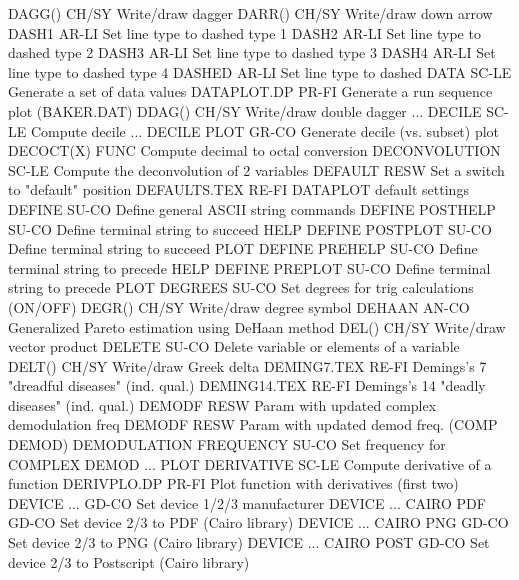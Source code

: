 DAGG()                      CH/SY Write/draw dagger
DARR()                      CH/SY Write/draw down arrow
DASH1                       AR-LI Set line type to dashed type 1
DASH2                       AR-LI Set line type to dashed type 2
DASH3                       AR-LI Set line type to dashed type 3
DASH4                       AR-LI Set line type to dashed type 4
DASHED                      AR-LI Set line type to dashed
DATA                        SC-LE Generate a set of data values
DATAPLOT.DP                 PR-FI Generate a run sequence plot (BAKER.DAT)
DDAG()                      CH/SY Write/draw double dagger
... DECILE                  SC-LE Compute decile
... DECILE PLOT             GR-CO Generate decile (vs. subset) plot
DECOCT(X)                   FUNC  Compute decimal to octal conversion
DECONVOLUTION               SC-LE Compute the deconvolution of 2 variables
DEFAULT                     RESW  Set a switch to "default" position
DEFAULTS.TEX                RE-FI DATAPLOT default settings
DEFINE                      SU-CO Define general ASCII string commands
DEFINE POSTHELP             SU-CO Define terminal string to succeed HELP
DEFINE POSTPLOT             SU-CO Define terminal string to succeed PLOT
DEFINE PREHELP              SU-CO Define terminal string to precede HELP
DEFINE PREPLOT              SU-CO Define terminal string to precede PLOT
DEGREES                     SU-CO Set degrees for trig calculations (ON/OFF)
DEGR()                      CH/SY Write/draw degree symbol
DEHAAN                      AN-CO Generalized Pareto estimation using DeHaan method
DEL()                       CH/SY Write/draw vector product
DELETE                      SU-CO Delete variable or elements of a variable
DELT()                      CH/SY Write/draw Greek delta
DEMING7.TEX                 RE-FI Demings's 7 "dreadful diseases" (ind. qual.)
DEMING14.TEX                RE-FI Demings's 14 "deadly diseases" (ind. qual.)
DEMODF                      RESW  Param with updated complex demodulation freq
DEMODF                      RESW  Param with updated demod freq. (COMP DEMOD)
DEMODULATION FREQUENCY      SU-CO Set frequency for COMPLEX DEMOD ... PLOT
DERIVATIVE                  SC-LE Compute derivative of a function
DERIVPLO.DP                 PR-FI Plot function with derivatives (first two)
DEVICE ...                  GD-CO Set device 1/2/3 manufacturer
DEVICE ... CAIRO PDF        GD-CO Set device 2/3 to PDF (Cairo library)
DEVICE ... CAIRO PNG        GD-CO Set device 2/3 to PNG (Cairo library)
DEVICE ... CAIRO POST       GD-CO Set device 2/3 to Postscript (Cairo library)

